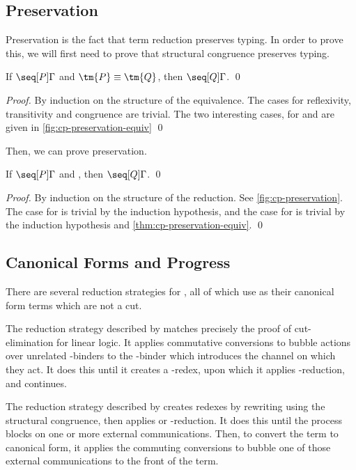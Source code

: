 \documentclass[UKenglish]{llncs}
\begin{document}
\subsection{Preservation}
\label{sec:cp-preservation}
Preservation is the fact that term reduction preserves typing. In order to prove
this, we will first need to prove that structural congruence preserves typing.
\begin{theorem}\label{thm:cp-preservation-equiv}
  If $\seq[{ P }]{ \Gamma }$ and $\tm{P} \equiv \tm{Q}$,
  then $\seq[{ Q }]{\Gamma }$.
  \qed
\end{theorem}
\begin{proof}
  By induction on the structure of the equivalence. The cases for reflexivity,
  transitivity and congruence are trivial. The two interesting cases, for
  \cpEquivCutComm and  are given in \cref{fig:cp-preservation-equiv}
  \qed
\end{proof}

Then, we can prove preservation.
\begin{theorem}[Preservation]\label{thm:cp-preservation}
  If $\seq[{ P }]{ \Gamma }$ and ,
  then $\seq[{ Q }]{ \Gamma }$.
  \qed
\end{theorem}
\begin{proof}
  By induction on the structure of the reduction.
  See \cref{fig:cp-preservation}.
  The case for \cpRedGammaCut is trivial by the induction hypothesis, and the
  case for \cpRedGammaEquiv is trivial by the induction hypothesis and
  \cref{thm:cp-preservation-equiv}.
  \qed
\end{proof}


\subsection{Canonical Forms and Progress}
\label{sec:cp-progress}
There are several reduction strategies for \cp, all of which use as their
canonical form terms which are not a cut.

The reduction strategy described by  matches precisely the
proof of cut-elimination for linear logic. It applies commutative conversions to
bubble actions over unrelated \textnu-binders to the \textnu-binder which
introduces the channel on which they act. It does this until it creates a
\textbeta-redex, upon which it applies \textbeta-reduction, and continues.

The reduction strategy described by \citeauthor{lindley2015semantics} creates
redexes by rewriting using the structural congruence, then applies
 or \textbeta-reduction. It does this until the process blocks on
one or more external communications. Then, to convert the term to canonical
form, it applies the commuting conversions to bubble one of those external
communications to the front of the term.
\end{document}
